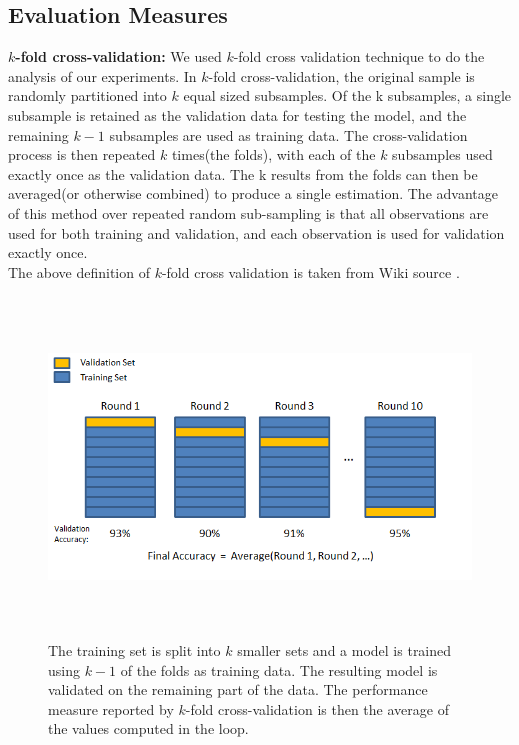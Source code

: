 \subsection{Evaluation Measures}
\textbf{$k$-fold cross-validation:} We used $k$-fold cross validation technique to do the analysis of our experiments. In $k$-fold cross-validation, the original sample is randomly partitioned into $k$ equal sized subsamples. Of the k subsamples, a single subsample is retained as the validation data for testing the model, and the remaining $k-1$ subsamples are used as training data. The cross-validation process is then repeated $k$ times(the folds), with each of the $k$ subsamples used exactly once as the validation data. The k results from the folds can then be averaged(or otherwise combined) to produce a single estimation. The advantage of this method over repeated random sub-sampling is that all observations are used for both training and validation, and each observation is used for validation exactly once.\\
The above definition of $k$-fold cross validation is taken from Wiki source \cite{cross_validation} .
\begin{figure}[h]
\centering
\includegraphics[width=\columnwidth,height=9cm]{figures/k_fold_cross_validation.png}
\caption{The training set is split into $k$ smaller sets and a model is trained using $k-1$ of the folds as training data. The resulting model is validated on the remaining part of the data. The performance measure reported by $k$-fold cross-validation is then the average of the values computed in the loop.}
\label{fig:k_fold_cross_validation}
\end{figure}

